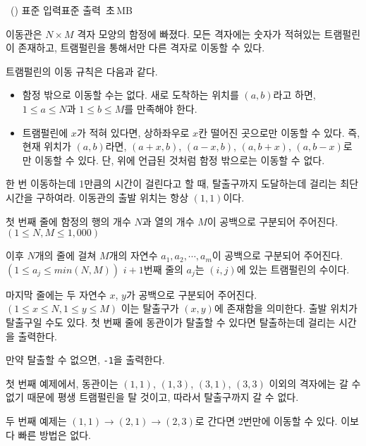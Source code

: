 \begin{problem}{\kcpcprobtrap\ (\kcpcprobtrapshort)}
    {표준 입력}{표준 출력}
    {\kcpcprobtraptime\,초}{\kcpcprobtrapmemory\,MB}{}
    
    이동관은 $ N \times M$ 격자 모양의 함정에 빠졌다. 모든 격자에는 숫자가 적혀있는 트램펄린이 존재하고, 트램펄린을 통해서만 다른 격자로 이동할 수 있다.
    
    트램펄린의 이동 규칙은 다음과 같다.
    
    \begin{itemize}
        \item 함정 밖으로 이동할 수는 없다. 새로 도착하는 위치를 $(a, b)$라고 하면, $1 \leq a \leq N$과 $1 \leq b \leq M$를 만족해야 한다.
        \item 트램펄린에 $ x $가 적혀 있다면, 상하좌우로 $ x $칸 떨어진 곳으로만 이동할 수 있다. 즉, 현재 위치가 $(a, b)$라면, $(a+x, b)$, $(a-x, b)$, $(a, b+x)$, $(a, b-x)$로만 이동할 수 있다. 단, 위에 언급된 것처럼 함정 밖으로는 이동할 수 없다.
    \end{itemize}
    
    한 번 이동하는데 1만큼의 시간이 걸린다고 할 때, 탈출구까지 도달하는데 걸리는 최단 시간을 구하여라. 이동관의 출발 위치는 항상 $(1, 1)$이다.
    
    \InputFile
    첫 번째 줄에 함정의 행의 개수 $ N $과 열의 개수 $ M $이 공백으로 구분되어 주어진다. $( 1 \leq N, M \leq 1,000 ) $
    
    이후 $N$개의 줄에 걸쳐 $M$개의 자연수 $a_{1}, a_{2}, \cdots, a_{m}$이 공백으로 구분되어 주어진다. $ (1 \leq a_{j} \leq min(N,M)) $ $i+1$번째 줄의 $a_{j}$는 $ (i, j) $에 있는 트램펄린의 수이다.
    
    마지막 줄에는 두 자연수 $x$, $y$가 공백으로 구분되어 주어진다. $(1 \leq x \leq N, 1 \leq y \leq M) $ 이는 탈출구가 $ (x, y) $에 존재함을 의미한다. 출발 위치가 탈출구일 수도 있다.
    \OutputFile
    첫 번째 줄에 동관이가 탈출할 수 있다면 탈출하는데 걸리는 시간을 출력한다. 
    
    만약 탈출할 수 없으면, \texttt{-1}을 출력한다.
   
    \Examples
    
    \begin{example}
    \end{example}
    
    \Explanation
    첫 번째 예제에서, 동관이는 $ (1,1) $, $ (1,3) $, $ (3,1) $, $ (3,3) $ 이외의 격자에는 갈 수 없기 때문에 평생 트램펄린을 탈 것이고, 따라서 탈출구까지 갈 수 없다.
    
    두 번째 예제는 $ (1,1) \rightarrow (2,1) \rightarrow (2,3)$로 간다면 2번만에 이동할 수 있다. 이보다 빠른 방법은 없다.
    
    
\end{problem}


